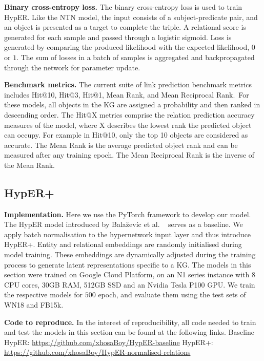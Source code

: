 \noindent \textbf{Binary cross-entropy loss.} The binary cross-entropy loss is used to train HypER. Like the NTN model, the input consists of a subject-predicate pair, and an object is presented as a target to complete the triple. A relational score is generated for each sample and passed through a logistic sigmoid. Loss is generated by comparing the produced likelihood with the expected likelihood, $ 0 $ or $ 1 $. The sum of losses in a batch of samples is aggregated and backpropagated through the network for parameter update. \par

\noindent \textbf{Benchmark metrics.} The current suite of link prediction benchmark metrics includes Hit@10, Hit@3, Hit@1, Mean Rank, and Mean Reciprocal Rank.\ For these models, all objects in the KG are assigned a probability and then ranked in descending order. The Hit@X metrics comprise the relation prediction accuracy measures of the model, where X describes the lowest rank the predicted object can occupy. For example in Hit@10, only the top 10 objects are considered as accurate. The Mean Rank is the average predicted object rank and can be measured after any training epoch. The Mean Reciprocal Rank is the inverse of the Mean Rank. \par



\subsection{HypER+}

\textbf{Implementation.} Here we use the PyTorch framework to develop our model. The HypER model introduced by Bala\u{z}ev\'{i}c et al. \unskip ~\citep{balazevic2019hypernetwork} serves as a baseline. We apply batch normalisation to the hypernetwork input layer and thus introduce HypER+. Entity and relational embeddings are randomly initialised during model training. These embeddings are dynamically adjusted during the training process to generate latent representations specific to a KG. The models in this section were trained on Google Cloud Platform, on an N1 series instance with  8 CPU cores, 30GB RAM, 512GB SSD and an Nvidia Tesla P100 GPU. We train the respective models for $ 500 $ epoch, and evaluate them using the test sets of WN18 and FB15k. \par

\noindent \textbf{Code to reproduce.} In the interest of reproducibility, all code needed to train and test the models in this section can be found at the following links. \newline
Baseline HypER: \url{https://github.com/xhosaBoy/HypER-baseline} \newline
HypER+: \url{https://github.com/xhosaBoy/HypER-normalised-relations} 

